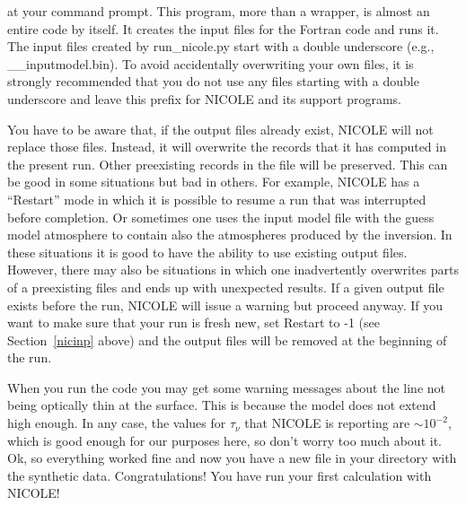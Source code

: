 \vskip12pt
\vskip12pt

at your command prompt. This program, more than a wrapper, is almost an
entire code by itself. It creates the input files for the
Fortran code and runs it. The input files created by run\_nicole.py
start with a double underscore (e.g., \_\_inputmodel.bin). To avoid
accidentally overwriting your own files, it is strongly recommended that
you do not use any files starting with a double underscore and leave
this prefix for NICOLE and its support programs.

You have to be aware that, if the output files already exist, NICOLE
will not replace those files. Instead, it will overwrite the records
that it has computed in the present run. Other preexisting records in
the file will be preserved. This can be good in some situations but
bad in others. For example, NICOLE has a ``Restart'' mode in which it
is possible to resume a run that was interrupted before completion. Or
sometimes one uses the input model file with the guess model
atmosphere to contain also the atmospheres produced by the
inversion. In these situations it is good to have the ability to use
existing output files. However, there may also be situations in which
one inadvertently overwrites parts of a preexisting files and ends up
with unexpected results. If a given output file exists before the run,
NICOLE will issue a warning but proceed anyway. If you want to make
sure that your run is fresh new, set Restart to -1 (see
Section~\ref{nicinp} above) and the output files will be removed at
the beginning of the run.

When you run the code you may get some warning messages about the line
not being optically thin at the surface. This is because the model
does not extend high enough. In any case, the values for $\tau_\nu$
that NICOLE is reporting are $\sim 10^{-2}$, which is good enough for
our purposes here, so don't worry too much about it. Ok, so everything
worked fine and now you have a new file in your directory with the
synthetic data.  Congratulations! You have run your first calculation
with NICOLE!


